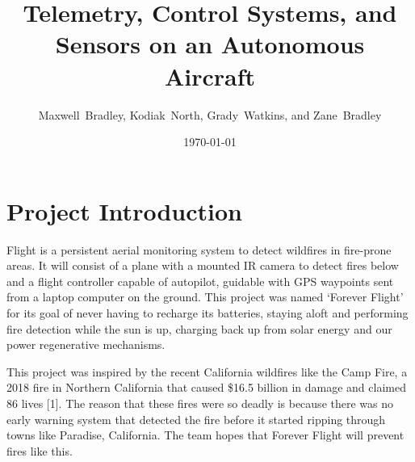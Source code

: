 \documentclass[12pt,journal,compsoc]{IEEEtran}
\begin{document}
\title{Telemetry, Control Systems, and Sensors on an Autonomous Aircraft}
\author{Maxwell~Bradley, Kodiak~North, Grady~Watkins, and Zane~Bradley}

\date{\today} %



\maketitle

\section{Project Introduction}

 Flight is a persistent aerial monitoring system to detect wildfires in fire-prone areas. It will consist of a plane with a mounted IR camera to detect fires below and a flight controller capable of autopilot, guidable with GPS waypoints sent from a laptop computer on the ground. This project was named `Forever Flight' for its goal of never having to recharge its batteries, staying aloft and performing fire detection while the sun is up, charging back up from solar energy and our power regenerative mechanisms. 

This project was inspired by the recent California wildfires like the Camp Fire, a 2018 fire in Northern California that caused \$16.5 billion in damage and claimed 86 lives [1]. The reason that these fires were so deadly is because there was no early warning system that detected the fire before it started ripping through towns like Paradise, California. The team hopes that Forever Flight will prevent fires like this.
\end{document}

